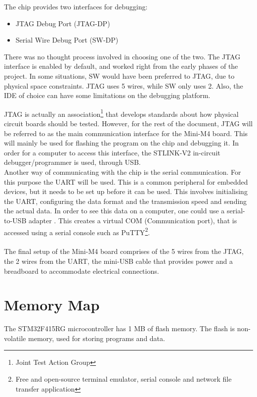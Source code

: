 The chip provides two interfaces for debugging:
\begin{itemize}[noitemsep]
	\item JTAG Debug Port (JTAG-DP)
	\item Serial Wire Debug Port (SW-DP)
\end{itemize}
There was no thought process involved in choosing one of the two.
The JTAG interface is enabled by default, and worked right from the
early phases of the project. In some situations, SW would have been
preferred to JTAG, due to physical space constraints. JTAG uses 5
wires, while SW only uses 2. Also, the IDE of choice can have some limitations
on the debugging platform.

JTAG is actually an association\footnote{Joint Test Action Group}
that develops standards about how
physical circuit boards should be tested. However, for the rest of
the document, JTAG will be referred to as the main communication interface
for the Mini-M4 board. This will mainly be used for flashing the program
on the chip and debugging it. In order for a computer to access this
interface, the STLINK-V2 in-circuit debugger/programmer\cite{st_link}
is used, through USB.\\

Another way of communicating with the chip is the serial communication.
For this purpose the UART will be used. This is a common peripheral for
embedded devices, but it needs to be set up before it can be used. This
involves initialising the UART, configuring the data format and the
transmission speed and sending the actual data. In order to see this data
on a computer, one could use a serial-to-USB adapter \cite{ttl_usb}.
This creates a virtual COM (Communication port), that is accessed using
a serial console such as PuTTY\footnote{Free and open-source terminal emulator, serial console and network file transfer application}.
\\\\
The final setup of the Mini-M4 board comprises of the 5 wires from the JTAG,
the 2 wires from the UART, the mini-USB cable that provides power and a
breadboard to accommodate electrical connections.


\section{Memory Map}
\label{sec:memory_map}
The STM32F415RG microcontroller has 1 MB of flash memory. The flash
is non-volatile memory, used for storing programs and
data.\\

